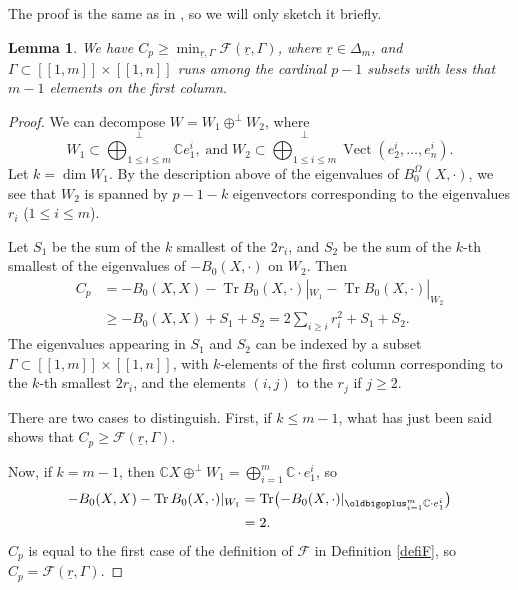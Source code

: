 \documentclass[JEP,XML,SOM,Unicode, NoEqCountersInSection,NoFloatCountersInSection,published]{cedram}
\let\mathcal\mathscr
\newcommand{\llbracket}{[\![}
\newcommand{\rrbracket}{]\!]}
\DeclareMathOperator{\Tr}{Tr}
\DeclareMathOperator{\Vect}{Vect}
\theoremstyle{theorem}
\newtheorem{lemma}[proposition]{Lemma}
\theoremstyle{definition}
\begin{document}
The proof is the same as in \cite{cad18}, so we will only sketch it briefly.
\begin{lemma}
We have $C_p \geq \min_{\underline{r}, \Gamma} \mathcal F(\underline{r}, \Gamma)$, where $\underline{r} \in \Delta_m$, and $\Gamma \subset \llbracket 1, m \rrbracket \times \llbracket 1, n \rrbracket$ runs among the cardinal $p-1$ subsets with less that $m-1$ elements on the first column.
\end{lemma}
\begin{proof}

We can decompose $W = W_1 \oplus^\perp W_2$, where
\[
W_1 \subset \overset{\perp}{\bigoplus_{1 \leq i \leq m}} \mathbb C e_1^i,\; \text{and} \; W_2 \subset \overset{\perp}{\bigoplus_{1 \leq i \leq m}} \Vect(e_2^i,\dots, e_n^i).
\]
Let $k = \dim W_1$. By the description above of the eigenvalues of $B_0^{\Omega}(X, \cdot)$, we see that $W_2$ is spanned by $p-1 -k$ eigenvectors corresponding to the eigenvalues $r_i$ ($1 \leq i \leq m$).

Let $S_1$ be the sum of the $k$ smallest of the $2r_i$, and $S_2$ be the sum of the $k$-th smallest of the eigenvalues of $-B_0(X, \cdot)$ on $W_2$. Then
\[
\begin{aligned}
C_p & = -B_0(X, X) - \Tr  B_0(X, \cdot)|_{W_1} - \Tr  B_0(X, \cdot)|_{W_2} \\
& \geq - B_0(X, X) + S_1 + S_2 = 2 \sum_{i \geq i} r_i^2 + S_1 + S_2.
\end{aligned}
\]
The eigenvalues appearing in $S_1$ and $S_2$ can be indexed by a subset $\Gamma \subset \llbracket 1, m \rrbracket \times \llbracket 1, n \rrbracket$, with $k$-elements of the first column corresponding to the $k$-th smallest $2 r_i$, and the elements $(i, j)$ to the $r_j$ if $j \geq 2$.

There are two cases to distinguish. First, if $k \leq m -1$, what has just been said shows that $C_p \geq \mathcal F(\underline{r}, \Gamma)$.

Now, if $k = m-1$, then $\mathbb C X \oplus^\perp W_1 = \bigoplus_{i=1}^m \mathbb C \cdot e_1^i$, so
\[
\begin{aligned}
-B_0(X, X) - \Tr  B_0(X, \cdot)|_{W_1} & = \Tr  \bigl( -B_0(X, \cdot)|_{\oldbigoplus_{i=1}^m \mathbb C \cdot e_1^i} \bigr) \\
& = 2.
\end{aligned}
\]
$C_p$ is equal to the first case of the definition of $\mathcal F$ in Definition \ref{defiF}, so $C_p = \mathcal F(\underline{r}, \Gamma)$.
\end{proof}
\end{document}
